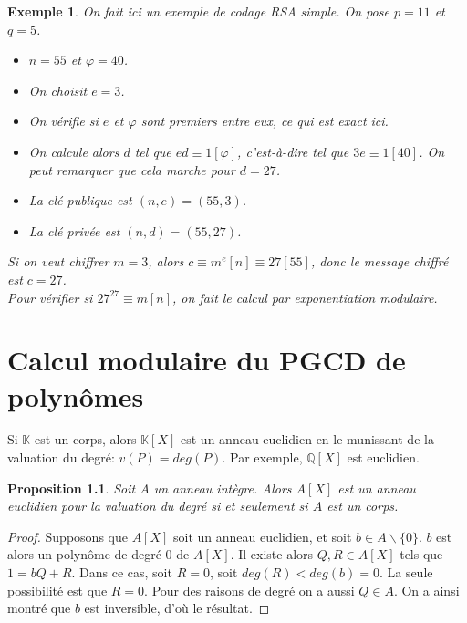 \documentclass[12pt]{report}
\newtheorem*{rap}{Rappels}
\newtheorem*{ex}{Exemple}
\newtheorem{Prop}[thm]{Proposition}
\begin{document}
\begin{ex}
On fait ici un exemple de codage RSA simple. On pose $p=11$ et $q=5$.
\begin{itemize}
\item[$1.$] $n=55$ et $\varphi=40$.
\item[$2.$] On choisit $e=3$.
\item[$3.$] On vérifie si $e$ et $\varphi$ sont premiers entre eux, ce qui est exact ici.
\item[$4.$] On calcule alors $d$ tel que $ed \equiv 1 [\varphi]$, c'est-à-dire tel que $3e \equiv 1[40]$. On peut remarquer que cela marche pour $d=27$.
\item[$5.$] La clé publique est $(n,e)=(55,3)$.
\item[$6.$] La clé privée est $(n,d)=(55,27)$. 
\end{itemize}
Si on veut chiffrer $m=3$, alors $c \equiv m^e[n] \equiv 27 [55]$, donc le message chiffré est $c=27$.\\
Pour vérifier si $27^{27} \equiv m [n]$, on fait le calcul par exponentiation modulaire.
\end{ex}




\chapter{Calcul modulaire du PGCD de polynômes}


Si $\mathbb{K}$ est un corps, alors $\mathbb{K}[X]$ est un anneau euclidien en le munissant de la valuation du degré: $v(P)=deg(P)$. Par exemple, $\mathbb{Q}[X]$ est euclidien.

\begin{Prop}
Soit $A$ un anneau intègre. Alors $A[X]$ est un anneau euclidien pour la valuation du degré si et seulement si $A$ est un corps.
\end{Prop}

\begin{proof}
Supposons que $A[X]$ soit un anneau euclidien, et soit $b \in A \smallsetminus \{  0 \}$. $b$ est alors un polynôme de degré 0 de $A [X]$. Il existe alors $Q,R \in A[X]$ tels que $1=bQ+R$. Dans ce cas, soit $R=0$, soit $deg(R)<deg(b)=0$. La seule possibilité est que $R=0$. Pour des raisons de degré on a aussi $Q\in A$. On a ainsi montré que $b$ est inversible, d'où le résultat.
\end{proof}
\end{document}
